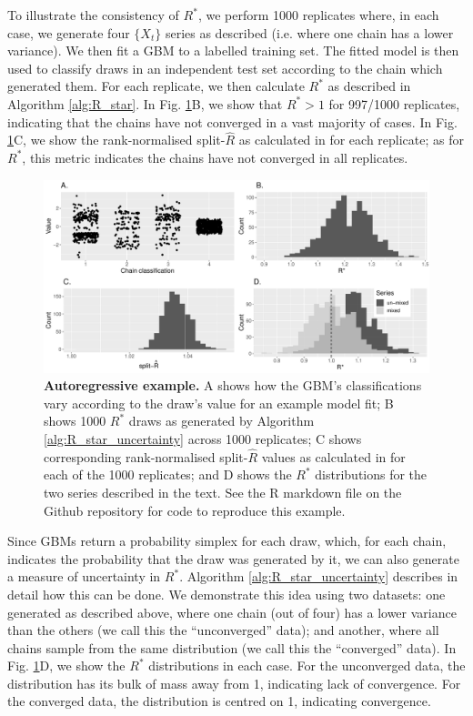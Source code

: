 \documentclass{article}
\begin{document}
To illustrate the consistency of $R^*$, we perform 1000 replicates where, in each case, we generate four $\{X_t\}$ series as described (i.e. where one chain has a lower variance). We then fit a GBM to a labelled training set. The fitted model is then used to classify draws in an independent test set according to the chain which generated them. For each replicate, we then calculate $R^*$ as described in Algorithm \ref{alg:R_star}. In Fig. \ref{fig:ar1}B, we show that $R^*>1$ for 997/1000 replicates, indicating that the chains have not converged in a vast majority of cases. In Fig. \ref{fig:ar1}C, we show the rank-normalised split-$\widehat{R}$ as calculated in \cite{vehtari2019rank} for each replicate; as for $R^*$, this metric indicates the chains have not converged in all replicates.

\begin{figure}[!htb]
	\centerline{\includegraphics[width=1.0\textwidth]{../output/ar1.pdf}}
	\caption{\textbf{Autoregressive example.} A shows how the GBM's classifications vary according to the draw's value for an example model fit; B shows 1000 $R^*$ draws as generated by Algorithm \ref{alg:R_star_uncertainty} across 1000 replicates; C shows corresponding rank-normalised split-$\widehat{R}$ values as calculated in \cite{vehtari2019rank} for each of the 1000 replicates; and D shows the $R^*$ distributions for the two series described in the text. See the R markdown file on the Github repository for code to reproduce this example.}
	\label{fig:ar1}
\end{figure}

Since GBMs return a probability simplex for each draw, which, for each chain, indicates the probability that the draw was generated by it, we can also generate a measure of uncertainty in $R^*$. Algorithm \ref{alg:R_star_uncertainty} describes in detail how this can be done. We demonstrate this idea using two datasets: one generated as described above, where one chain (out of four) has a lower variance than the others (we call this the ``unconverged'' data); and another, where all chains sample from the same distribution (we call this the ``converged'' data). In Fig. \ref{fig:ar1}D, we show the $R^*$ distributions in each case. For the unconverged data, the distribution has its bulk of mass away from 1, indicating lack of convergence. For the converged data, the distribution is centred on 1, indicating convergence. 
\end{document}
